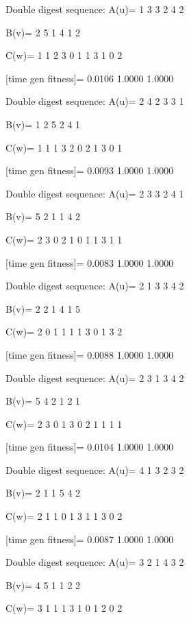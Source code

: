 Double digest sequence:
A(u)=
     1     3     3     2     4     2

B(v)=
     2     5     1     4     1     2

C(w)=
     1     1     2     3     0     1     1     3     1     0     2

[time gen fitness]=
    0.0106    1.0000    1.0000

Double digest sequence:
A(u)=
     2     4     2     3     3     1

B(v)=
     1     2     5     2     4     1

C(w)=
     1     1     1     3     2     0     2     1     3     0     1

[time gen fitness]=
    0.0093    1.0000    1.0000

Double digest sequence:
A(u)=
     2     3     3     2     4     1

B(v)=
     5     2     1     1     4     2

C(w)=
     2     3     0     2     1     0     1     1     3     1     1

[time gen fitness]=
    0.0083    1.0000    1.0000

Double digest sequence:
A(u)=
     2     1     3     3     4     2

B(v)=
     2     2     1     4     1     5

C(w)=
     2     0     1     1     1     1     3     0     1     3     2

[time gen fitness]=
    0.0088    1.0000    1.0000

Double digest sequence:
A(u)=
     2     3     1     3     4     2

B(v)=
     5     4     2     1     2     1

C(w)=
     2     3     0     1     3     0     2     1     1     1     1

[time gen fitness]=
    0.0104    1.0000    1.0000

Double digest sequence:
A(u)=
     4     1     3     2     3     2

B(v)=
     2     1     1     5     4     2

C(w)=
     2     1     1     0     1     3     1     1     3     0     2

[time gen fitness]=
    0.0087    1.0000    1.0000

Double digest sequence:
A(u)=
     3     2     1     4     3     2

B(v)=
     4     5     1     1     2     2

C(w)=
     3     1     1     1     3     1     0     1     2     0     2


